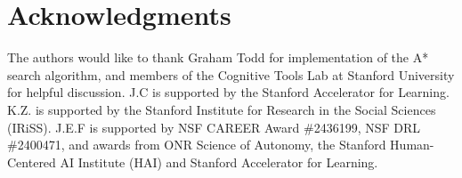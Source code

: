 \documentclass[10pt,letterpaper]{article}
\begin{document}


\section{Acknowledgments}
The authors would like to thank Graham Todd for implementation of the A* search algorithm, and members of the Cognitive Tools Lab at Stanford University for helpful discussion. 
J.C is supported by the Stanford Accelerator for Learning. 
K.Z. is supported by the Stanford Institute for Research in the Social Sciences (IRiSS).
J.E.F is supported by NSF CAREER Award \#2436199, NSF DRL \#2400471, and awards from ONR Science of Autonomy, the Stanford Human-Centered AI Institute (HAI) and Stanford Accelerator for Learning.





\setlength{\bibleftmargin}{.125in}
\setlength{\bibindent}{-\bibleftmargin}


% 

\end{document}

